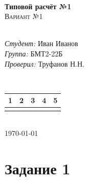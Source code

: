 \documentclass[12pt]{article}
\begin{document}
\begin{titlepage}

\HRule \\[0.5cm]
{ \huge \bfseries Типовой расчёт №1}\\[0.5cm] %
\textsc{\Large Вариант №1}\\[0.5cm] %
\HRule \\[0.5cm]
 

\begin{minipage}{0.8\textwidth}
\begin{flushleft} \large
\emph{Студент:} Иван Иванов\\%
\emph{Группа:} БМТ2-22Б\\%
\emph{Проверил:} Труфанов Н.Н.\\
\end{flushleft}
\end{minipage}\\[1cm]


\begin{tabular}{ p{50pt} | p{50pt}| p{50pt}| p{50pt}| p{50pt} }%
1 & 2 & 3 & 4 & 5\\ \hline
 &  &  &  & \\[3ex]
\end{tabular}\\[2cm]

\today

\end{titlepage}

\section*{Задание 1}
\end{document}
